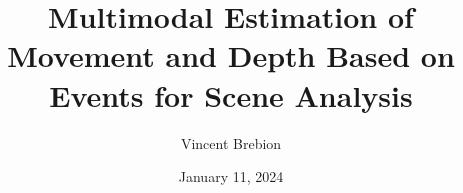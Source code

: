 \documentclass[a4paper,12pt]{memoir}
\title{Multimodal Estimation of Movement and Depth Based on Events for Scene Analysis}
\author{Vincent Brebion}
\date{January 11, 2024}
\begin{document}
\frontmatter{}










\mainmatter{}








\appendix






\backmatter{}



\end{document}
